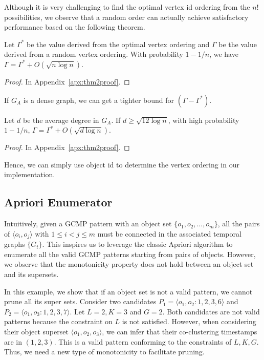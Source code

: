 Although it is very challenging to find the optimal vertex id ordering from the $n!$ possibilities, we observe that a random order can actually achieve satisfactory performance based on the following theorem.


\begin{theorem}
\label{THM:SPM_LB}
Let $\Gamma^*$ be the value derived from the optimal vertex ordering and  $\Gamma$ be the value derived from a random vertex ordering. With probability $1-1/n$, we have $\Gamma = \Gamma^* + O(\sqrt{n \log n})$.
\end{theorem}
\begin{proof}
In Appendix~\ref{apx:thm2proof}.
\end{proof}
If $G_A$ is a dense graph, we can get a tighter bound for $(\Gamma - \Gamma^*)$.
\begin{theorem}
\label{THM:SPM_LB_INC}
Let $d$ be the average degree in $G_A$. If $d\geq \sqrt{12\log n}$, with
high probability $1-1/n$, $\Gamma = \Gamma^* + O(\sqrt{d\log n})$.
\end{theorem}
\begin{proof}
In Appendix~\ref{apx:thm2proof}.
\end{proof}
Hence, we can simply use object id to determine the vertex ordering in our implementation.


\subsection{Apriori Enumerator}
Intuitively, given a GCMP pattern with an object set $\{o_1,o_2,\ldots,o_m\}$, 
all the pairs of $\langle o_i,o_j \rangle$ with $1\leq i<j\leq m$ must 
be connected in the associated temporal graphs $\{G_t\}$. This inspires us to leverage the classic Apriori algorithm to enumerate all the valid GCMP patterns starting from pairs of objects. However, we observe that the monotonicity property does not hold between an object set and its supersets.

\begin{example}
In this example, we show that if an object set is not a valid pattern, we cannot prune all its super sets.
Consider two candidates $P_1=\langle o_1,o_2:1,2,3,6 \rangle$ and $P_2=\langle o_1,o_3:1,2,3,7 \rangle$. 
Let $L=2,K=3$ and $G=2$. Both candidates are not valid patterns because the constraint on $L$ is not satisfied. 
However, when considering their object superset $\langle o_1,o_2,o_3 \rangle$, we can infer that their co-clustering timestamps are in $(1,2,3)$. This is a valid pattern conforming to the constraints of $L,K,G$. Thus, we need a new type of monotonicity to facilitate pruning.
\end{example}   


